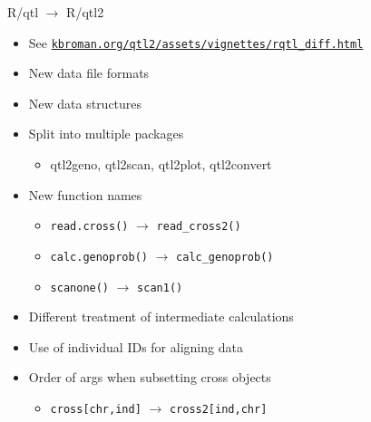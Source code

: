 \documentclass[12pt]{article}
\newcommand{\headsize}{\fontsize{35}{35} \selectfont}
\newcommand{\smallsize}{\fontsize{25}{30} \selectfont}
\newcommand{\smallersize}{\fontsize{20}{25} \selectfont}
\newcommand{\smallestsize}{\fontsize{18}{22} \selectfont}
\begin{document}
\newpage

\headsize \color{myyellow}
\hfill\begin{minipage}{5.75in}
\centering
R/qtl $\rightarrow$ R/qtl2
\end{minipage}

\vspace{1cm}

\color{mywhite} \smallsize

\hfill \begin{minipage}[t]{9.5in}
\begin{itemize}
\setlength{\rightskip}{0pt plus 1fil} %
\item See
  \href{http://kbroman.org/qtl2/assets/vignettes/rqtl_diff.html}{\smallestsize
    \tt kbroman.org/qtl2/assets/vignettes/rqtl\_diff.html}
\item New data file formats
\item New data structures
\item Split into multiple packages
  \begin{itemize}
  \item[] {\color{myblue} \smallersize qtl2geno, qtl2scan, qtl2plot, qtl2convert}
  \end{itemize}
\item New function names
  \begin{itemize}
  \item[] {\color{myblue} \smallersize \verb|read.cross()| $\rightarrow$ \verb|read_cross2()|}
  \item[] {\color{myblue} \smallersize \verb|calc.genoprob()| $\rightarrow$ \verb|calc_genoprob()|}
  \item[] {\color{myblue} \smallersize \verb|scanone()| $\rightarrow$ \verb|scan1()|}
  \end{itemize}
\item Different treatment of intermediate calculations
\item Use of individual IDs for aligning data
\item Order of args when subsetting cross objects
  \begin{itemize}
  \item[] {\color{myblue} \smallersize \verb|cross[chr,ind]| $\rightarrow$ \verb|cross2[ind,chr]|}
  \end{itemize}
\end{itemize} \end{minipage}




\newpage
\end{document}
